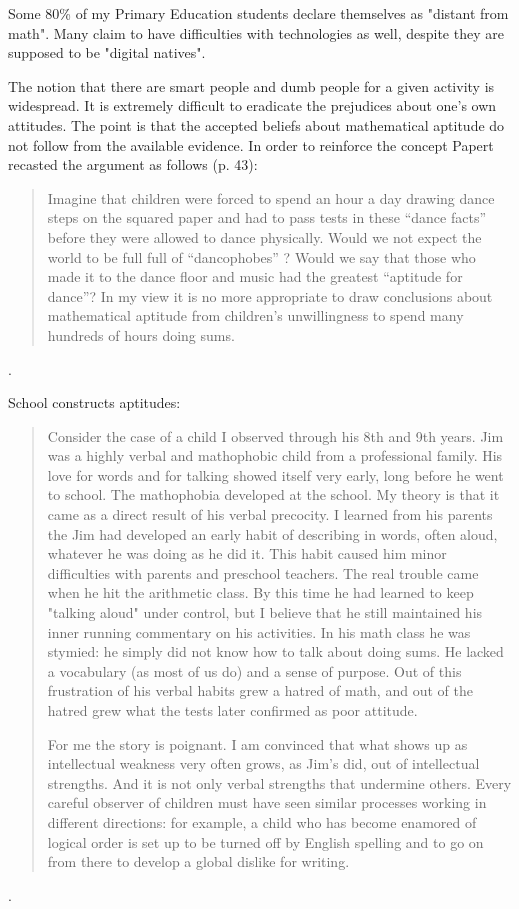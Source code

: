 Some 80\% of my Primary Education students declare themselves as "distant from math". Many claim to have difficulties with technologies as well, despite they are supposed to be "digital natives".

The notion that there are smart people and dumb people for a given activity is widespread. It is extremely difficult to eradicate the prejudices about one's own attitudes. The point is that the accepted beliefs about mathematical aptitude do not follow from the available evidence. In order to reinforce the concept Papert recasted the argument as follows \cite{Papert} (p. 43):

\begin{quote}
Imagine that children were forced to spend an hour a day drawing dance steps on the squared paper and had to pass tests in these “dance facts” before they were allowed to dance physically. Would we not expect the world to be full  full of “dancophobes” ? Would we say that those who made it to the dance floor and music had the greatest “aptitude for dance”? In my view it is no more appropriate to draw conclusions about mathematical aptitude from children's unwillingness to spend many hundreds of hours doing sums.
\end{quote}.  

School constructs aptitudes:

\begin{quote}
Consider the case of a child I observed through his 8th and 9th years. Jim was a highly verbal and mathophobic child from a professional family. His love for words and for talking showed itself very early, long before he went to school. The mathophobia developed at the school. My theory is that it came as a direct result of his verbal precocity. I learned from his parents the Jim had developed an early habit of describing in words, often aloud, whatever he was doing as he did it. This habit caused him minor difficulties with parents and preschool teachers. The real trouble came when he hit the arithmetic class. By this time he had learned to keep "talking aloud" under control, but I believe that he still maintained his inner running commentary on his activities. In his math class he was stymied: he simply did not know how to talk about doing sums. He lacked a vocabulary (as most of us do) and a sense of purpose. Out of this frustration of his verbal habits grew a hatred of math, and out of the hatred grew what the tests later confirmed as poor attitude.

For me the story is poignant. I am convinced that what shows up as intellectual weakness very often grows, as Jim's did, out of intellectual strengths. And it is not only verbal strengths that undermine others. Every careful observer of children must have seen similar processes working in different directions: for example, a child who has become enamored of logical order is set up to be turned off by English spelling and to go on from there to develop a global dislike for writing.  
\end{quote}.  

